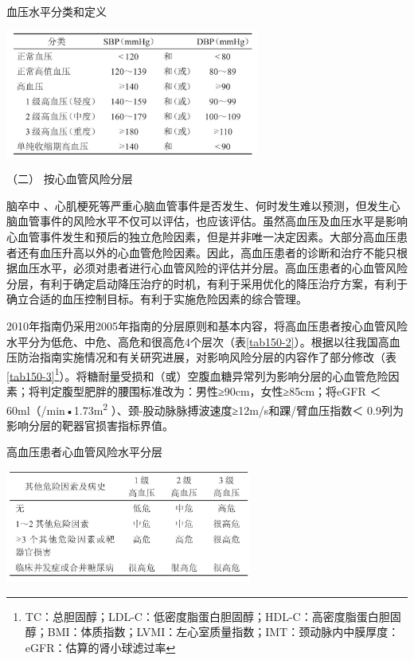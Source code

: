 \begin{table}[htbp]
\centering
\caption{血压水平分类和定义}
\label{tab150-1}
\includegraphics[width=3.28125in,height=1.64583in]{./images/Image00554.jpg}
\end{table}



\hypertarget{text00409.htmlux5cux23CHP17-3-1-4-2}{}
（二） 按心血管风险分层

脑卒中
、心肌梗死等严重心脑血管事件是否发生、何时发生难以预测，但发生心脑血管事件的风险水平不仅可以评估，也应该评估。虽然高血压及血压水平是影响心血管事件发生和预后的独立危险因素，但是并非唯一决定因素。大部分高血压患者还有血压升高以外的心血管危险因素。因此，高血压患者的诊断和治疗不能只根据血压水平，必须对患者进行心血管风险的评估并分层。高血压患者的心血管风险分层，有利于确定启动降压治疗的时机，有利于采用优化的降压治疗方案，有利于确立合适的血压控制目标。有利于实施危险因素的综合管理。

2010年指南仍采用2005年指南的分层原则和基本内容，将高血压患者按心血管风险水平分为低危、中危、高危和很高危4个层次（表\ref{tab150-2}）。根据以往我国高血压防治指南实施情况和有关研究进展，对影响风险分层的内容作了部分修改（表\ref{tab150-3}\footnote{TC：总胆固醇；LDL-C：低密度脂蛋白胆固醇；HDL-C：高密度脂蛋白胆固醇；BMI：体质指数；LVMI：左心室质量指数；IMT：颈动脉内中膜厚度：eGFR：估算的肾小球滤过率}）。将糖耐量受损和（或）空腹血糖异常列为影响分层的心血管危险因素；将判定腹型肥胖的腰围标准改为：男性≥90cm，女性≥85cm；将eGFR
＜ 60ml（/min•1.73m\textsuperscript{2}
）、颈-股动脉脉搏波速度≥12m/s和踝/臂血压指数＜
0.9列为影响分层的靶器官损害指标界值。

\begin{table}[htbp]
\centering
\caption{高血压患者心血管风险水平分层}
\label{tab150-2}
\includegraphics[width=3.1875in,height=1.44792in]{./images/Image00555.jpg}
\end{table}

